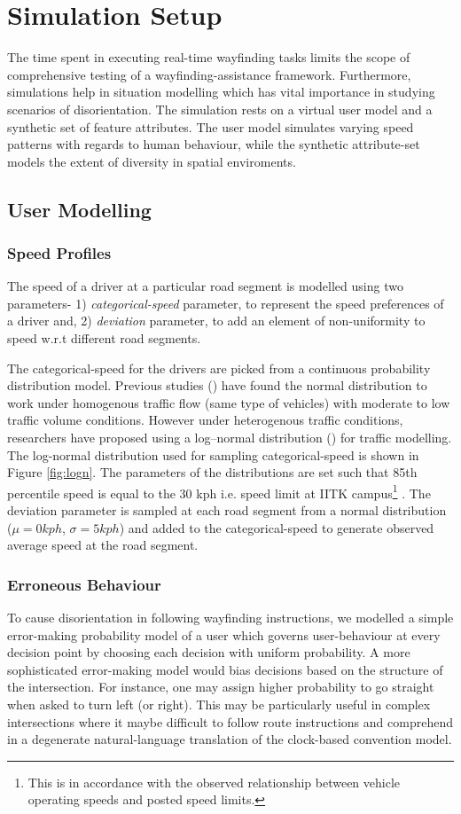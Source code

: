 \documentclass{iitkthesis}
\begin{document}
 \section{Simulation Setup} 
The time spent in executing real-time wayfinding tasks limits the scope of comprehensive testing of a wayfinding-assistance framework. Furthermore, simulations help in situation modelling which has vital importance in studying scenarios of disorientation. The simulation rests on a virtual user model and a synthetic set of feature attributes. The user model simulates varying speed patterns with regards to human behaviour, while the synthetic attribute-set models the extent of diversity in spatial enviroments.
  \subsection{User Modelling}
  \subsubsection*{Speed Profiles}
The speed of a driver at a particular road segment is modelled using two parameters- 1) \textit{categorical-speed} parameter, to represent the speed preferences of a driver and, 2) \textit{deviation} parameter, to add an element of non-uniformity to speed w.r.t different road segments.

The categorical-speed for the drivers are picked from a continuous probability distribution model. Previous studies (\cite{leong,mclean}) have found the normal distribution to work under homogenous traffic flow (same type of vehicles) with moderate to low traffic volume conditions. However under heterogenous traffic conditions, researchers have proposed using a log–normal distribution (\cite{gerl}) for traffic modelling. The log-normal distribution used for sampling categorical-speed is shown in Figure \ref{fig:logn}. The parameters of the distributions are set such that 85th percentile speed is equal to the 30 kph i.e. speed limit at IITK campus\footnote{This is in accordance with the observed relationship between vehicle operating speeds and posted speed limits.} . The deviation parameter is sampled at each road segment from a normal distribution ($\mu=0 kph$, $\sigma=5 kph$) and added to the categorical-speed to generate observed average speed at the road segment.
  \subsubsection*{Erroneous Behaviour}
To cause disorientation in following wayfinding instructions, we modelled a simple error-making probability model of a user which governs user-behaviour at every decision point by choosing each decision with uniform probability. A more sophisticated error-making model would bias decisions based on the structure of the intersection. For instance, one may assign higher probability to go straight when asked to turn left (or right). This may be particularly useful in complex intersections where it maybe difficult to follow route instructions and comprehend in a degenerate natural-language translation of the clock-based convention model.
\end{document}
